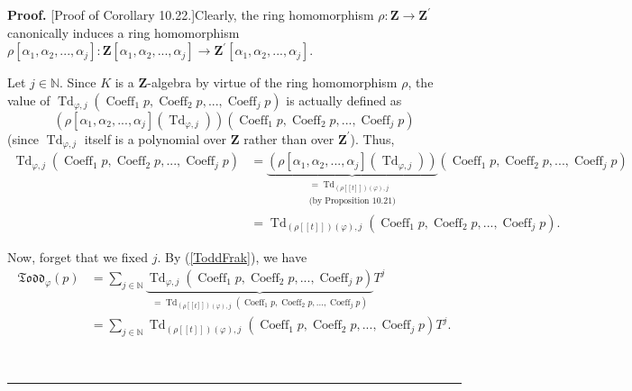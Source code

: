 \documentclass[numbers=enddot,12pt,final,onecolumn,notitlepage]{scrartcl}%
\newenvironment{proof}[1][Proof]{\noindent\textbf{#1.} }{\ \rule{0.5em}{0.5em}}
\begin{document}
\begin{proof}
[Proof of Corollary 10.22.]Clearly, the ring homomorphism $\rho:\mathbf{Z}%
\rightarrow\mathbf{Z}^{\prime}$ canonically induces a ring homomorphism
$\rho\left[  \alpha_{1},\alpha_{2},...,\alpha_{j}\right]  :\mathbf{Z}\left[
\alpha_{1},\alpha_{2},...,\alpha_{j}\right]  \rightarrow\mathbf{Z}^{\prime
}\left[  \alpha_{1},\alpha_{2},...,\alpha_{j}\right]  $.

Let $j\in\mathbb{N}$. Since $K$ is a $\mathbf{Z}$-algebra by virtue of the
ring homomorphism $\rho$, the value of $\operatorname*{Td}\nolimits_{\varphi
,j}\left(  \operatorname*{Coeff}\nolimits_{1}p,\operatorname*{Coeff}%
\nolimits_{2}p,...,\operatorname*{Coeff}\nolimits_{j}p\right)  $ is actually
defined as%
\[
\left(  \rho\left[  \alpha_{1},\alpha_{2},...,\alpha_{j}\right]  \left(
\operatorname*{Td}\nolimits_{\varphi,j}\right)  \right)  \left(
\operatorname*{Coeff}\nolimits_{1}p,\operatorname*{Coeff}\nolimits_{2}%
p,...,\operatorname*{Coeff}\nolimits_{j}p\right)
\]
(since $\operatorname*{Td}\nolimits_{\varphi,j}$ itself is a polynomial over
$\mathbf{Z}$ rather than over $\mathbf{Z}^{\prime}$). Thus,%
\begin{align*}
\operatorname*{Td}\nolimits_{\varphi,j}\left(  \operatorname*{Coeff}%
\nolimits_{1}p,\operatorname*{Coeff}\nolimits_{2}p,...,\operatorname*{Coeff}%
\nolimits_{j}p\right)   &  =\underbrace{\left(  \rho\left[  \alpha_{1}%
,\alpha_{2},...,\alpha_{j}\right]  \left(  \operatorname*{Td}%
\nolimits_{\varphi,j}\right)  \right)  }_{\substack{=\operatorname*{Td}%
\nolimits_{\left(  \rho\left[  \left[  t\right]  \right]  \right)  \left(
\varphi\right)  ,j}\\\text{(by Proposition 10.21)}}}\left(
\operatorname*{Coeff}\nolimits_{1}p,\operatorname*{Coeff}\nolimits_{2}%
p,...,\operatorname*{Coeff}\nolimits_{j}p\right) \\
&  =\operatorname*{Td}\nolimits_{\left(  \rho\left[  \left[  t\right]
\right]  \right)  \left(  \varphi\right)  ,j}\left(  \operatorname*{Coeff}%
\nolimits_{1}p,\operatorname*{Coeff}\nolimits_{2}p,...,\operatorname*{Coeff}%
\nolimits_{j}p\right)  .
\end{align*}


Now, forget that we fixed $j$. By (\ref{ToddFrak}), we have%
\begin{align*}
\mathfrak{Todd}_{\varphi}\left(  p\right)   &  =\sum\limits_{j\in\mathbb{N}%
}\underbrace{\operatorname*{Td}\nolimits_{\varphi,j}\left(
\operatorname*{Coeff}\nolimits_{1}p,\operatorname*{Coeff}\nolimits_{2}%
p,...,\operatorname*{Coeff}\nolimits_{j}p\right)  }_{=\operatorname*{Td}%
\nolimits_{\left(  \rho\left[  \left[  t\right]  \right]  \right)  \left(
\varphi\right)  ,j}\left(  \operatorname*{Coeff}\nolimits_{1}%
p,\operatorname*{Coeff}\nolimits_{2}p,...,\operatorname*{Coeff}\nolimits_{j}%
p\right)  }T^{j}\\
&  =\sum\limits_{j\in\mathbb{N}}\operatorname*{Td}\nolimits_{\left(
\rho\left[  \left[  t\right]  \right]  \right)  \left(  \varphi\right)
,j}\left(  \operatorname*{Coeff}\nolimits_{1}p,\operatorname*{Coeff}%
\nolimits_{2}p,...,\operatorname*{Coeff}\nolimits_{j}p\right)  T^{j}.
\end{align*}



\end{proof}
\end{document}

